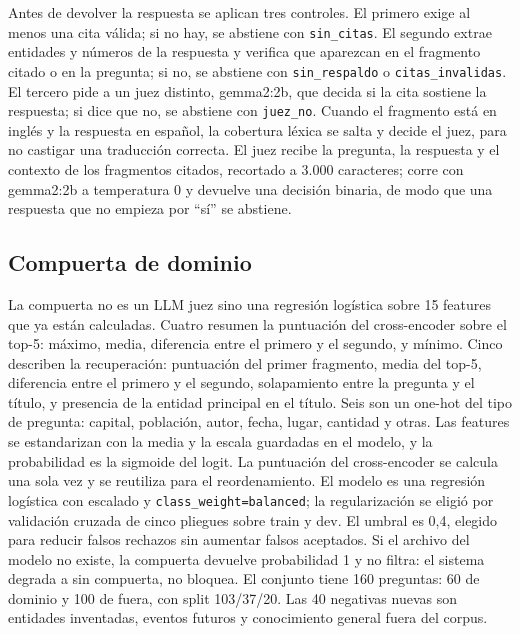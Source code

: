 Antes de devolver la respuesta se aplican tres controles. El primero exige al menos una cita v\'alida; si no hay, se abstiene con \texttt{sin\_citas}. El segundo extrae entidades y n\'umeros de la respuesta y verifica que aparezcan en el fragmento citado o en la pregunta; si no, se abstiene con \texttt{sin\_respaldo} o \texttt{citas\_invalidas}. El tercero pide a un juez distinto, gemma2:2b, que decida si la cita sostiene la respuesta; si dice que no, se abstiene con \texttt{juez\_no}. Cuando el fragmento est\'a en ingl\'es y la respuesta en espa\~nol, la cobertura l\'exica se salta y decide el juez, para no castigar una traducci\'on correcta. El juez recibe la pregunta, la respuesta y el contexto de los fragmentos citados, recortado a 3.000 caracteres; corre con gemma2:2b a temperatura 0 y devuelve una decisi\'on binaria, de modo que una respuesta que no empieza por ``s\'i'' se abstiene.

\subsection{Compuerta de dominio}
\label{sec:compuerta}

La compuerta no es un LLM juez sino una regresi\'on log\'istica sobre 15 features que ya est\'an calculadas. Cuatro resumen la puntuaci\'on del cross-encoder sobre el top-5: m\'aximo, media, diferencia entre el primero y el segundo, y m\'inimo. Cinco describen la recuperaci\'on: puntuaci\'on del primer fragmento, media del top-5, diferencia entre el primero y el segundo, solapamiento entre la pregunta y el t\'itulo, y presencia de la entidad principal en el t\'itulo. Seis son un one-hot del tipo de pregunta: capital, poblaci\'on, autor, fecha, lugar, cantidad y otras. Las features se estandarizan con la media y la escala guardadas en el modelo, y la probabilidad es la sigmoide del logit. La puntuaci\'on del cross-encoder se calcula una sola vez y se reutiliza para el reordenamiento. El modelo es una regresi\'on log\'istica con escalado y \texttt{class\_weight=balanced}; la regularizaci\'on se eligi\'o por validaci\'on cruzada de cinco pliegues sobre train y dev. El umbral es 0,4, elegido para reducir falsos rechazos sin aumentar falsos aceptados. Si el archivo del modelo no existe, la compuerta devuelve probabilidad 1 y no filtra: el sistema degrada a sin compuerta, no bloquea. El conjunto tiene 160 preguntas: 60 de dominio y 100 de fuera, con split 103/37/20. Las 40 negativas nuevas son entidades inventadas, eventos futuros y conocimiento general fuera del corpus.

